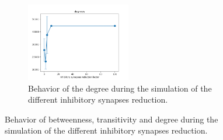 \begin{figure}
\begin{subfigure}[t]{0.48\textwidth}
    \label{fig:transitivity-evolution}
  \end{subfigure}
  \begin{subfigure}[t]{\textwidth}
    \centering
    \includegraphics[width=0.5\textwidth]{degrees_dir_evolution}
    \caption{Behavior of the degree during the simulation of the different inhibitory synapses reduction.}
    \label{fig:degree-evolution}
  \end{subfigure}
  \caption{Behavior of betweenness, transitivity and degree during the simulation of the different inhibitory synapses reduction.}
  \label{fig:feature-distribution-behavior-3}
\end{figure}

